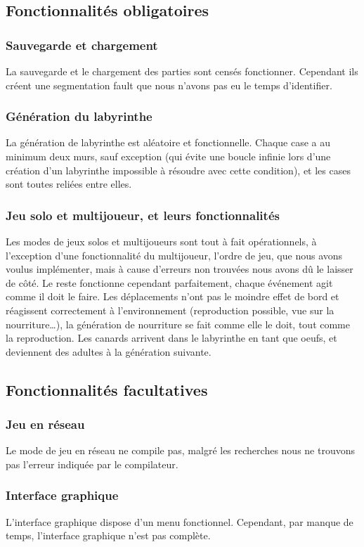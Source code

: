 ﻿\documentclass[12pt,a4paper,twoside]{article}
\begin{document}
\subsection{Fonctionnalités obligatoires}
\subsubsection{Sauvegarde et chargement}
    La sauvegarde et le chargement des parties sont censés fonctionner. Cependant ils créent une segmentation fault que nous n’avons pas eu le temps d’identifier. 
\subsubsection{Génération du labyrinthe}
    La génération de labyrinthe est aléatoire et fonctionnelle. Chaque case a au minimum deux murs, sauf exception (qui évite une boucle infinie lors d’une création d’un labyrinthe impossible à résoudre avec cette condition), et les cases sont toutes reliées entre elles. 
\subsubsection{Jeu solo et multijoueur, et leurs fonctionnalités }
    Les modes de jeux solos et multijoueurs sont tout à fait opérationnels, à l’exception d’une fonctionnalité du multijoueur, l’ordre de jeu, que nous avons voulus implémenter, mais à cause d’erreurs non trouvées nous avons dû le laisser de côté. Le reste fonctionne cependant parfaitement, chaque événement agit comme il doit le faire. Les déplacements n’ont pas le moindre effet de bord et réagissent correctement à l'environnement (reproduction possible, vue sur la nourriture…), la génération de nourriture se fait comme elle le doit, tout comme la reproduction. Les canards arrivent dans le labyrinthe en tant que oeufs, et deviennent des adultes à la génération suivante.
\subsection{Fonctionnalités facultatives}
\subsubsection{Jeu en réseau}
    Le mode de jeu en réseau ne compile pas, malgré les recherches nous ne trouvons pas l’erreur indiquée par le compilateur.
\subsubsection{Interface graphique}
    L’interface graphique dispose d’un menu fonctionnel. Cependant, par manque de temps, l’interface graphique n’est pas complète.
\end{document}
